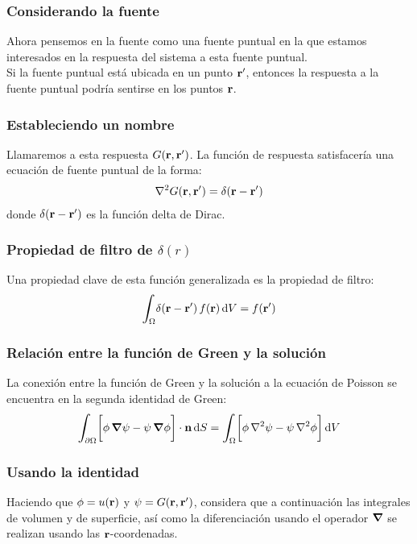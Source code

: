 \documentclass[12pt]{beamer}
\begin{document}
\begin{frame}
\frametitle{Considerando la fuente}
Ahora pensemos en la fuente como una fuente puntual en la que estamos interesados en la respuesta del sistema a esta fuente puntual.
\\
\bigskip
\pause
Si la fuente puntual está ubicada en un punto $\vb{\ensuremath{{r}^{\prime}}}$, entonces la respuesta a la fuente puntual podría sentirse en los puntos $\vb{r}$.
\end{frame}

\begin{frame}
\frametitle{Estableciendo un nombre}
Llamaremos a esta respuesta $G(\vb{r}, \vb{\ensuremath{{r}^{\prime}}})$. \pause La función de respuesta satisfacería una ecuación de fuente puntual de la forma:
\pause
\begin{align*}
\laplacian G(\vb{r}, \vb{\pderivada{r}}) = \delta (\vb{r} - \vb{\pderivada{r}})
\end{align*}
donde $\delta (\vb{r} - \vb{\ensuremath{{r}^{\prime}}})$ es la función delta de Dirac.
\end{frame}

\begin{frame}
\frametitle{Propiedad de filtro de $\delta (r)$}
Una propiedad clave de esta función generalizada es la propiedad de filtro:
\pause
\begin{align*}
\scaleint{6ex}_{\bs \Omega} \delta (\vb{r} - \vb{\pderivada{r}}) \, f (\vb{r}) \dd{V} = f (\vb{\pderivada{r}})
\end{align*}
\end{frame}

\begin{frame}
\frametitle{Relación entre la función de Green y la solución}
La conexión entre la función de Green y la solución a la ecuación de Poisson se encuentra en la segunda identidad de Green:
\pause
\begin{align*}
\scaleint{6ex}_{\bs \partial \Omega} \bigg[ \phi \, \grad{\psi} - \psi \, \grad{\phi} \bigg] \cdot \vb{n} \dd{S} = \scaleint{6ex}_{\bs \Omega} \bigg[ \phi \, \laplacian{\psi} - \psi \, \laplacian{\phi} \bigg] \dd{V}
\end{align*}
\end{frame}

\begin{frame}
\frametitle{Usando la identidad}
Haciendo que $\phi = u (\vb{r})$ y $\psi = G (\vb{r}, \vb{\ensuremath{{r}^{\prime}}})$, \pause considera que a continuación las integrales de volumen y de superficie, así como la diferenciación usando el operador $\grad$ se realizan usando las $\vb{r}$-coordenadas.
\end{frame}
\end{document}
